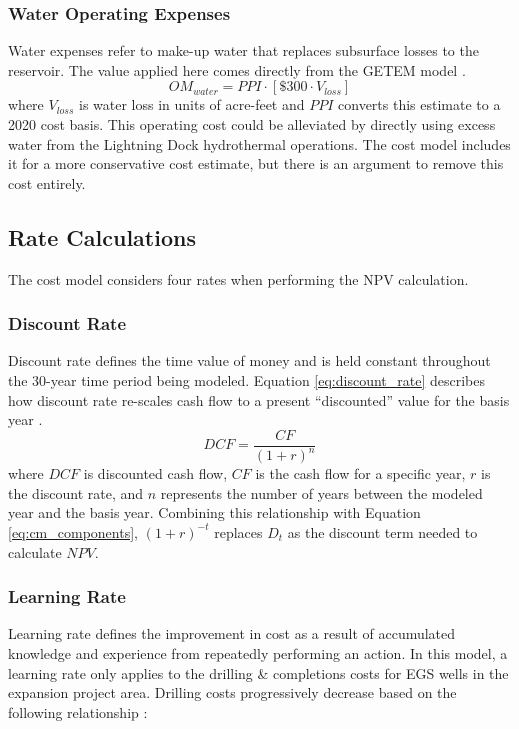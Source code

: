 \subsubsection{Water Operating Expenses}\label{ch4:cm_opex_water}
Water expenses refer to make-up water that replaces subsurface losses to the reservoir. The value applied here comes directly from the GETEM model \citep{eere_getem_2012}.
\begin{equation}
\label{eq:cm_om_water}
    OM_{water} = PPI \cdot \left[\$300 \cdot V_{loss}\right]
\end{equation}
where $V_{loss}$ is water loss in units of acre-feet and $PPI$ converts this estimate to a 2020 cost basis. This operating cost could be alleviated by directly using excess water from the Lightning Dock hydrothermal operations. The cost model includes it for a more conservative cost estimate, but there is an argument to remove this cost entirely.

\subsection{Rate Calculations}\label{ch4:cm_rate_calcs}
The cost model considers four rates when performing the NPV calculation.

\subsubsection{Discount Rate}\label{ch4:discount_rate}
Discount rate defines the time value of money and is held constant throughout the 30-year time period being modeled. Equation \ref{eq:discount_rate} describes how discount rate re-scales cash flow to a present ``discounted'' value for the basis year \citep[p.\ 199]{de_neufville_flexibility_2011}.
\begin{equation}
    \label{eq:discount_rate}
    DCF = \frac{CF}{(1+r)^n}
\end{equation}
where $DCF$ is discounted cash flow, $CF$ is the cash flow for a specific year,  $r$ is the discount rate, and $n$ represents the number of years between the modeled year and the basis year. Combining this relationship with Equation \ref{eq:cm_components}, $(1+r)^{-t}$ replaces $D_t$ as the discount term needed to calculate $NPV$.

\subsubsection{Learning Rate}\label{ch4:learn_rate}
Learning rate defines the improvement in cost as a result of accumulated knowledge and experience from repeatedly performing an action. In this model, a learning rate only applies to the drilling \& completions costs for EGS wells in the expansion project area. Drilling costs progressively decrease based on the following relationship \citep[p.\ 213]{de_neufville_flexibility_2011}:

